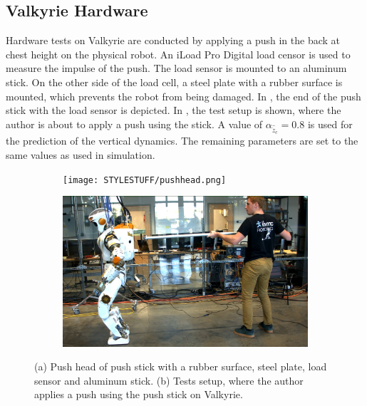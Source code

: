 \subsection{Valkyrie Hardware} 
Hardware tests on Valkyrie are conducted by applying a push in the back at chest height on the physical robot. An iLoad Pro Digital load censor \cite{iload} is used to measure the impulse of the push. The load sensor is mounted to an aluminum stick. On the other side of the load cell, a steel plate with a rubber surface is mounted, which prevents the robot from being damaged. In , the end of the push stick with the load sensor is depicted. In , the test setup is shown, where the author is about to apply a push using the stick. A value of $\alpha_{\hat{\ddot{z}}_{c}}=0.8$ is used for the prediction of the vertical dynamics. The remaining parameters are set to the same values as used in simulation.
\begin{figure}
\centering
  \begin{subfigure}{0.495\textwidth}
  \centering
  \texttt{[image: STYLESTUFF/pushhead.png]}
   \caption{}
    \label{fig:pushhead}
  \end{subfigure}
  \begin{subfigure}{0.495\textwidth}
    \centering
  \includegraphics[width=.94\linewidth]{STYLESTUFF/authorpush.png}
  \caption{}
   \label{fig:authorpush}
  \end{subfigure}
  \caption{(a) Push head of push stick with a rubber surface, steel plate, load sensor and aluminum stick. (b) Tests setup, where the author applies a push using the push stick on Valkyrie.}
  \label{fig:pushsetup}
\end{figure}

